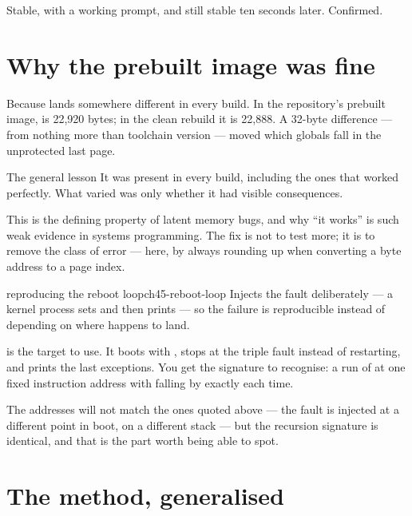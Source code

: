 Stable, with a working prompt, and still stable ten seconds later. Confirmed.

\section{Why the prebuilt image was fine}

Because  lands somewhere different in every build. In the repository's prebuilt
image,  is 22,920 bytes; in the clean rebuild it is 22,888. A 32-byte difference ---
from nothing more than toolchain version --- moved which globals fall in the unprotected last page.

\begin{concept}{The general lesson}
 It was present in every build, including the ones that worked
perfectly. What varied was only whether it had visible consequences.

This is the defining property of latent memory bugs, and why ``it works'' is such weak evidence in
systems programming. The fix is not to test more; it is to remove the class of error --- here, by
always rounding up when converting a byte address to a page index.
\end{concept}

\begin{recipe}{reproducing the reboot loop}{ch45-reboot-loop}
Injects the fault deliberately --- a kernel process sets  and then prints
--- so the failure is reproducible instead of depending on where  happens to
land.

 is the target to use. It boots with , stops at
the triple fault instead of restarting, and prints the last exceptions. You get the signature to
recognise: a run of  at one fixed instruction address with  falling by exactly
 each time.

The addresses will not match the ones quoted above --- the fault is injected at a different point
in boot, on a different stack --- but the recursion signature is identical, and that is the part
worth being able to spot.
\end{recipe}

\section{The method, generalised}

